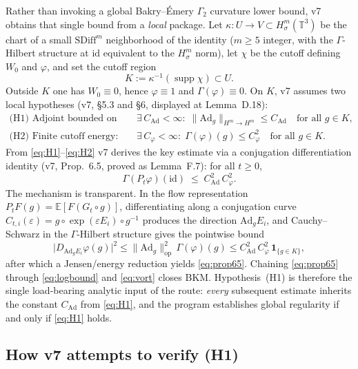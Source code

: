\documentclass[11pt]{article}
\theoremstyle{definition}
\newcommand{\SDiff}{\mathrm{SDiff}}
\newcommand{\Ad}{\mathrm{Ad}}
\newcommand{\Hm}{H^m}
\newcommand{\Hms}{H^m_\sigma}
\newcommand{\CAd}{C_{\mathrm{Ad}}}
\newcommand{\Cphi}{C_\varphi}
\begin{document}
Rather than invoking a global Bakry--\'Emery $\Gamma_2$ curvature lower bound,
v7 obtains that single bound from a \emph{local} package. Let
$\kappa : U \to V \subset \Hms(\mathbb{T}^3)$ be the chart of a small
$\SDiff^m$ neighborhood of the identity ($m\ge 5$ integer, with the
$\Gamma$-Hilbert structure at $\mathrm{id}$ equivalent to the $\Hms$ norm), let
$\chi$ be the cutoff defining $W_0$ and $\varphi$, and set the cutoff region
\[
  K := \kappa^{-1}(\operatorname{supp}\chi)\subset U .
\]
Outside $K$ one has $W_0\equiv 0$, hence $\varphi\equiv 1$ and
$\Gamma(\varphi)\equiv 0$. On $K$, v7 assumes two local hypotheses (v7,
\S5.3 and \S6, displayed at Lemma~D.18):
\begin{align}
  \text{(H1) Adjoint bounded on support:} \quad
    & \exists\,\CAd<\infty : \;
      \|\Ad_g\|_{\Hm\to\Hm}\le \CAd \quad \text{for all } g\in K,
      \label{eq:H1}\\[2pt]
  \text{(H2) Finite cutoff energy:} \quad
    & \exists\,\Cphi<\infty : \;
      \Gamma(\varphi)(g)\le \Cphi^2 \quad \text{for all } g\in K.
      \label{eq:H2}
\end{align}
From \eqref{eq:H1}--\eqref{eq:H2} v7 derives the key estimate via a conjugation
differentiation identity (v7, Prop.~6.5, proved as Lemma~F.7): for all $t\ge 0$,
\begin{equation}
  \Gamma(P_t\varphi)(\mathrm{id}) \;\le\; \CAd^2\,\Cphi^2 .
  \label{eq:prop65}
\end{equation}
The mechanism is transparent. In the flow representation
$P_t F(g)=\mathbb{E}[F(G_t\circ g)]$, differentiating along a conjugation curve
$C_{t,i}(\varepsilon)=g\circ\exp(\varepsilon E_i)\circ g^{-1}$ produces the
direction $\Ad_g E_i$, and Cauchy--Schwarz in the $\Gamma$-Hilbert structure
gives the pointwise bound
\begin{equation}
  \bigl|D_{\Ad_g E_i}\varphi(g)\bigr|^2
    \le \|\Ad_g\|_{\mathrm{op}}^2\,\Gamma(\varphi)(g)
    \le \CAd^2\,\Cphi^2\,\mathbf{1}_{\{g\in K\}} ,
  \label{eq:cauchyschwarz}
\end{equation}
after which a Jensen/energy reduction yields \eqref{eq:prop65}. Chaining
\eqref{eq:prop65} through \eqref{eq:logbound} and \eqref{eq:vort} closes BKM.
Hypothesis~(H1) is therefore the single load-bearing analytic input of the
route: \emph{every} subsequent estimate inherits the constant $\CAd$ from
\eqref{eq:H1}, and the program establishes global regularity if and only if
\eqref{eq:H1} holds.

\subsection{How v7 attempts to verify (H1)}
\end{document}
